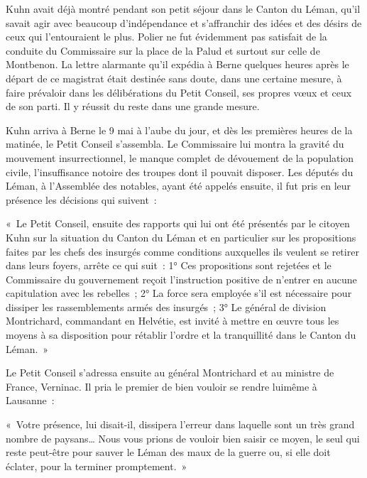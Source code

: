 \documentclass[french,twoside]{book} %
\newenvironment{quoteblock}%
  {\begin{quoting}}
  {\end{quoting}}
\newenvironment{quotebar}{%
    \def\FrameCommand{{\color{rubric!10!}\vrule width 0.5em} \hspace{0.9em}}%
    \def\OuterFrameSep{\itemsep} %
    \MakeFramed {\advance\hsize-\width \FrameRestore}
  }%
  {%
    \endMakeFramed
  }
\renewenvironment{quoteblock}%
  {%
    \savenotes
    \setstretch{0.9}
    \normalfont
    \begin{quotebar}
  }
  {%
    \end{quotebar}
    \spewnotes
  }
\begin{document}
\noindent Kuhn avait déjà montré pendant son petit séjour dans le Canton du Léman, qu’il savait agir avec beaucoup d’indépendance et s’affranchir des idées et des désirs de ceux qui l’entouraient le plus. Polier ne fut évidemment pas satisfait de la conduite du Commissaire sur la place de la Palud et surtout sur celle de Montbenon. La lettre alarmante qu’il expédia à Berne quelques heures après le départ de ce magistrat était destinée sans doute, dans une certaine mesure, à faire prévaloir dans les délibérations du Petit Conseil, ses propres vœux et ceux de son parti. Il y réussit du reste dans une grande mesure.\par
Kuhn arriva à Berne le 9 mai à l’aube du jour, et dès les premières heures de la matinée, le Petit Conseil s’assembla. Le Commissaire lui montra la gravité du mouvement insurrectionnel, le manque complet de dévouement de la population civile, l’insuffisance notoire des troupes dont il pouvait disposer. Les députés du Léman, à l’Assemblée des notables, ayant été appelés ensuite, il fut pris en leur présence les décisions qui suivent :\par

\begin{quoteblock}
 \noindent « Le Petit Conseil, ensuite des rapports qui lui ont été présentés par le citoyen Kuhn sur la situation du Canton du Léman et en particulier sur les propositions faites par les chefs des insurgés comme conditions auxquelles ils veulent se retirer dans leurs foyers, arrête ce qui suit : 1° Ces propositions sont rejetées et le Commissaire du gouvernement reçoit l’instruction positive de n’entrer en aucune capitulation avec les rebelles ; 2° La force sera employée s’il est nécessaire pour dissiper les rassemblements armés des insurgés ; 3° Le général de division Montrichard, commandant en Helvétie, est invité à mettre en œuvre tous les moyens à sa disposition pour rétablir l’ordre et la tranquillité dans le Canton du Léman. »
 \end{quoteblock}

\noindent Le Petit Conseil s’adressa ensuite au général Montrichard et au ministre de France, Verninac. Il pria le premier de bien vouloir se rendre luimême à Lausanne :\par

\begin{quoteblock}
\noindent « Votre présence, lui disait-il, dissipera l’erreur dans laquelle sont un très grand nombre de paysans… Nous vous prions de vouloir bien saisir ce moyen, le seul qui reste peut-être pour sauver le Léman des maux de la guerre ou, si elle doit éclater, pour la terminer promptement. »\end{quoteblock}
\end{document}
